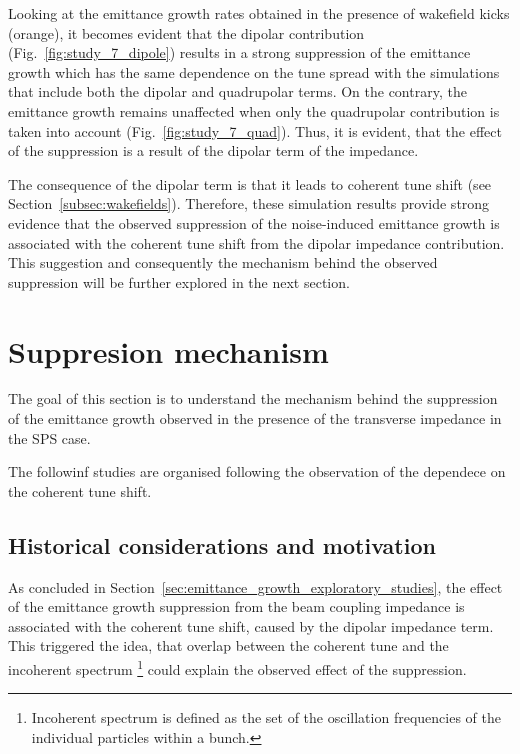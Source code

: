 Looking at the emittance growth rates obtained in the presence of wakefield kicks (orange), it becomes evident that the dipolar contribution (Fig.~\ref{fig:study_7_dipole}) results in a strong suppression of the emittance growth which has the same dependence on the tune spread with the simulations that include both the dipolar and quadrupolar terms. On the contrary, the emittance growth remains unaffected when only the quadrupolar contribution is taken into account (Fig.~\ref{fig:study_7_quad}). Thus, it is evident, that the effect of the suppression is a result of the dipolar term of the impedance. 

The consequence of the dipolar term is that it leads to coherent tune shift (see Section~\ref{subsec:wakefields}). Therefore, these simulation results provide strong evidence that the observed suppression of the noise-induced emittance growth is associated with the coherent tune shift from the dipolar impedance contribution. This suggestion and consequently the mechanism behind the observed suppression will be further explored in the next section.


\section{Suppresion mechanism}\label{sec:suppression_mechanism}
The goal of this section is to understand the mechanism behind the suppression of the emittance growth observed in the presence of the transverse impedance in the SPS case. 


The followinf studies are organised following the observation of the dependece on the coherent tune shift.

\subsection{Historical considerations and motivation}\label{subsec:past_studies_impedance_suppression_BB}

As concluded in Section~\ref{sec:emittance_growth_exploratory_studies}, the effect of the emittance growth suppression from the beam coupling impedance is associated with the coherent tune shift, caused by the dipolar impedance term. This triggered the idea, that overlap between the coherent tune and the incoherent spectrum \footnote{Incoherent spectrum is defined as the set of the oscillation frequencies of the individual particles within a bunch.} could explain the observed effect of the suppression. 

